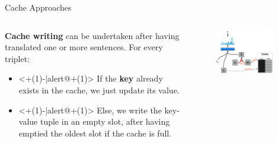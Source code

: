 \begin{frame}{Cache Approaches}
	\begin{columns}[c] %
		\begin{column}{.50\textwidth}
			\textbf{Cache writing} can be undertaken after having translated one or more sentences. For every triplet:
			\begin{itemize}
				\item<+(1)-|alert@+(1)> If the \textbf{key} already exists in the cache, we just update its value.  
				\item<+(1)-|alert@+(1)> Else, we write the key-value tuple in an empty slot, after having emptied the oldest slot if the cache is full.
			\end{itemize} 
		\end{column}%
		\hfill%
		\begin{column}{.50\textwidth}
			\begin{figure}
				\centering
				\includegraphics[width=0.9\textwidth]{Images/cache_only}
				\label{fig:cacheonly}
			\end{figure}
		\end{column}%
	\end{columns} 
\end{frame}

